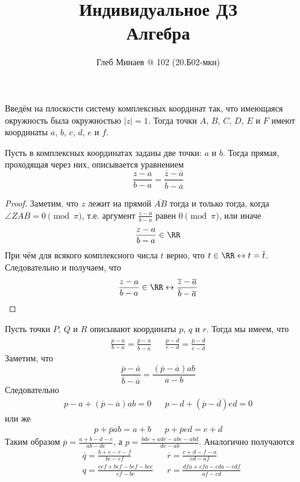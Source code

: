\documentclass[12pt,a4paper]{article}
\title{Индивидуальное ДЗ\\Алгебра}
\author{Глеб Минаев @ 102 (20.Б02-мкн)}
\begin{document}
    \maketitle

    \begin{enumproblem}[2.42]
        Введём на плоскости систему комплексных координат так, что имеющаяся окружность была окружностью $|z| = 1$. Тогда точки $A$, $B$, $C$, $D$, $E$ и $F$ имеют координаты $a$, $b$, $c$, $d$, $e$ и $f$.

        \begin{lemma}
            Пусть в комплексных координатах заданы две точки: $a$ и $b$. Тогда прямая, проходящая через них, описывается уравнением
            \[\frac{z - a}{b - a} = \frac{\overline{z} - \overline{a}}{\overline{b} - \overline{a}}\]
        \end{lemma}

        \begin{proof}
            Заметим, что $z$ лежит на прямой $\overline{AB}$ тогда и только тогда, когда $\angle ZAB = 0 \pmod{\pi}$, т.е. аргумент $\frac{z-a}{b-a}$ равен $0 \pmod{\pi}$, или иначе
            \[\frac{z - a}{b - a} \in \RR\]
            При чём для всякого комплексного числа $t$ верно, что $t \in \RR \leftrightarrow t = \overline{t}$. Следовательно и получаем, что
            \[\frac{z - a}{b - a} \in \RR \leftrightarrow \frac{\overline{z} - \overline{a}}{\overline{b} - \overline{a}}\]
        \end{proof}

        Пусть точки $P$, $Q$ и $R$ описывают координаты $p$, $q$ и $r$. Тогда мы имеем, что
        \begin{align*}
            &\frac{p-a}{b-a} = \frac{\overline{p} - \overline{a}}{\overline{b} - \overline{a}}&
            &\frac{p-d}{e-d} = \frac{\overline{p} - \overline{d}}{\overline{e} - \overline{d}}&
        \end{align*}
        Заметим, что
        \[\frac{\overline{p} - \overline{a}}{\overline{b} - \overline{a}} = \frac{(\overline{p} - \overline{a})ab}{a - b}\]
        Следовательно
        \begin{align*}
            &p-a + (\overline{p} - \overline{a})ab = 0&
            &p-d + (\overline{p} - \overline{d})ed = 0&
        \end{align*}
        или же
        \begin{align*}
            &p + \overline{p}ab = a + b&
            &p + \overline{p}ed = e + d&
        \end{align*}
        Таким образом $\overline{p} = \frac{a + b - d - e}{ab - de}$, а $p = \frac{bde + ade - abe - abd}{de - ab}$. Аналогично получаются
        \begin{align*}
            &\overline{q} = \frac{b + c - e - f}{bc - ef}&
            &\overline{r} = \frac{c + d - f - a}{cd - af}\\
            &q = \frac{cef + bef - bcf - bce}{ef - bc}&
            &r = \frac{dfa + cfa - cda - cdf}{af - cd}\\
        \end{align*}


\end{enumproblem}
\end{document}
